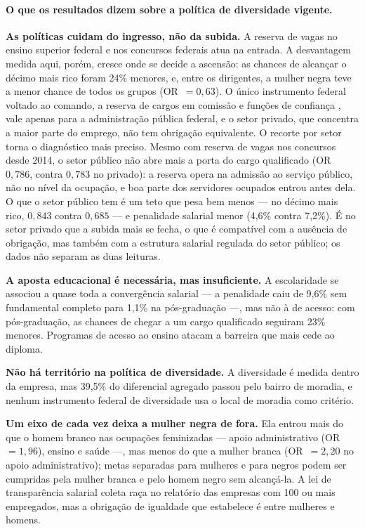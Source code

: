 \documentclass[11pt, a4paper, oneside]{article}
\begin{document}
\paragraph{O que os resultados dizem sobre a política de diversidade vigente.}
\textbf{As políticas cuidam do ingresso, não da subida.} A reserva de vagas no ensino superior federal \cite{brasil2012lei12711, brasil2023lei14723} e nos concursos federais \cite{brasil2014lei12990, brasil2025lei15142} atua na entrada. A desvantagem medida aqui, porém, cresce onde se decide a ascensão: as chances de alcançar o décimo mais rico foram 24\% menores, e, entre os dirigentes, a mulher negra teve a menor chance de todos os grupos (OR~$=0,63$). O único instrumento federal voltado ao comando, a reserva de cargos em comissão e funções de confiança \cite{brasil2023decreto11443}, vale apenas para a administração pública federal, e o setor privado, que concentra a maior parte do emprego, não tem obrigação equivalente. O recorte por setor torna o diagnóstico mais preciso. Mesmo com reserva de vagas nos concursos desde 2014, o setor público não abre mais a porta do cargo qualificado (OR~$0,786$, contra $0,783$ no privado): a reserva opera na admissão ao serviço público, não no nível da ocupação, e boa parte dos servidores ocupados entrou antes dela. O que o setor público tem é um teto que pesa bem menos --- no décimo mais rico, $0,843$ contra $0,685$ --- e penalidade salarial menor (4,6\% contra 7,2\%). É no setor privado que a subida mais se fecha, o que é compatível com a ausência de obrigação, mas também com a estrutura salarial regulada do setor público; os dados não separam as duas leituras.

\textbf{A aposta educacional é necessária, mas insuficiente.} A escolaridade se associou a quase toda a convergência salarial --- a penalidade caiu de 9,6\% sem fundamental completo para 1,1\% na pós-graduação ---, mas não à de acesso: com pós-graduação, as chances de chegar a um cargo qualificado seguiram 23\% menores. Programas de acesso ao ensino atacam a barreira que mais cede ao diploma.

\textbf{Não há território na política de diversidade.} A diversidade é medida dentro da empresa, mas 39,5\% do diferencial agregado passou pelo bairro de moradia, e nenhum instrumento federal de diversidade usa o local de moradia como critério.

\textbf{Um eixo de cada vez deixa a mulher negra de fora.} Ela entrou mais do que o homem branco nas ocupações feminizadas --- apoio administrativo (OR~$=1,96$), ensino e saúde ---, mas menos do que a mulher branca (OR~$=2,20$ no apoio administrativo); metas separadas para mulheres e para negros podem ser cumpridas pela mulher branca e pelo homem negro sem alcançá-la. A lei de transparência salarial \cite{brasil2023lei14611} coleta raça no relatório das empresas com 100 ou mais empregados, mas a obrigação de igualdade que estabelece é entre mulheres e homens.
\end{document}
